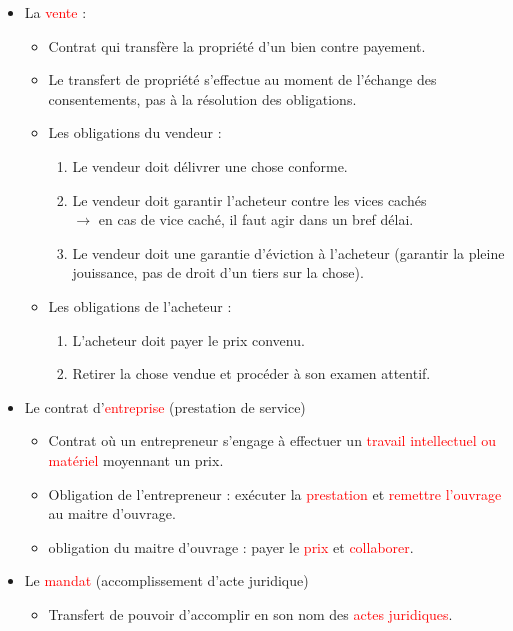 \begin{itemize}
	\item La \textcolor{red}{vente} :
	\begin{itemize}
		\item Contrat qui transfère la propriété d'un bien contre payement.
		\item Le transfert de propriété s'effectue au moment de l'échange des consentements, pas à la résolution des obligations.
		\item Les obligations du vendeur :
		\begin{enumerate}
			\item Le vendeur doit délivrer une chose conforme.
			\item Le vendeur doit garantir l'acheteur contre les vices cachés\\
			$\rightarrow$ en cas de vice caché, il faut agir dans un bref délai.
			\item Le vendeur doit une garantie d'éviction à l'acheteur (garantir la pleine jouissance, pas de droit d'un tiers sur la chose).
		\end{enumerate}
		\item Les obligations de l'acheteur :
		\begin{enumerate}
			\item L'acheteur doit payer le prix convenu.
			\item Retirer la chose vendue et procéder à son examen attentif.
		\end{enumerate}
	\end{itemize}
	\item Le contrat d'\textcolor{red}{entreprise} (prestation de service)
	\begin{itemize}
		\item Contrat où un entrepreneur s'engage à effectuer un \textcolor{red}{travail intellectuel ou matériel} moyennant un prix.
		\item Obligation de l'entrepreneur : exécuter la \textcolor{red}{prestation} et \textcolor{red}{remettre l'ouvrage} au maitre d'ouvrage.
		\item obligation du maitre d'ouvrage : payer le \textcolor{red}{prix} et \textcolor{red}{collaborer}.
	\end{itemize}
	\item Le \textcolor{red}{mandat} (accomplissement d'acte juridique)
	\begin{itemize}
		\item Transfert de pouvoir d'accomplir en son nom des \textcolor{red}{actes juridiques}.\\

\end{itemize}
\end{itemize}
